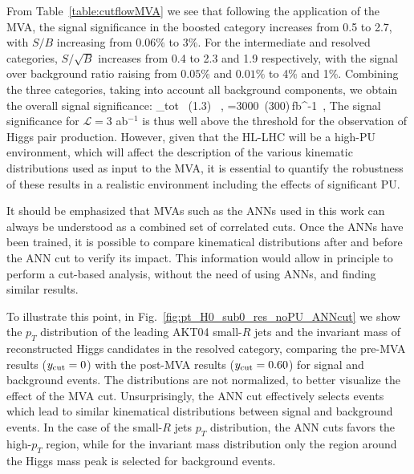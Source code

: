 From Table~\ref{table:cutflowMVA} we see that
following the application of the MVA, 
the signal significance in the boosted category increases
from 0.5 to 2.7, with $S/B$ increasing from $0.06\%$ to $3\%$.
%
For the intermediate and resolved categories, $S/\sqrt{B}$
increases from 0.4 to 2.3 and 1.9 respectively, with
the signal over background ratio raising from
$0.05\%$ and $0.01\%$ to 4\% and 1\%.
%
Combining the three categories, taking into
account all background components, we obtain the overall signal
significance:
\be
\label{eq:soverb}
\lp {}\rp_{\rm tot} ~(1.3) \, ,\quad
{}=3000~(300)\,{\rm fb}^{-1}\, ,
\ee
%
The signal significance for
$\mathcal{L}=3$ ab$^{-1}$
is thus
well above the threshold for the observation of Higgs
pair production.
%
However, given that the HL-LHC will be a high-PU environment,
which will affect the description of the various
kinematic distributions used as input to the MVA,
it is essential to quantify the robustness of these
results
in a realistic environment including the effects of
significant PU.



It should be emphasized that MVAs such as the ANNs used in this work can always be understood as
a combined set of correlated cuts.
%
Once the ANNs have been trained, it is possible to compare  kinematical distributions after and before the ANN  cut to verify its impact.
%
This information would allow in principle to perform a cut-based analysis, without the need of using ANNs,
and finding similar results.


To illustrate this point,
in Fig.~\ref{fig:pt_H0_sub0_res_noPU_ANNcut} we show
the $p_T$ distribution of the leading AKT04 small-$R$ jets
and the invariant mass of reconstructed Higgs candidates in the resolved
  category, comparing the pre-MVA results ($y_{\rm cut}=0$) with the post-MVA
  results ($y_{\rm cut}=0.60$) for signal and background  events.
  The distributions are not normalized, to better visualize the effect
  of the MVA cut.
  Unsurprisingly, the ANN cut effectively selects events which
  lead to similar kinematical distributions between signal
  and background events.
  In the case of the small-$R$ jets $p_T$ distribution, the
  ANN cuts favors the
  high-$p_T$ region, while for the invariant mass distribution
  only the region around the Higgs mass peak is selected for
  background events.


